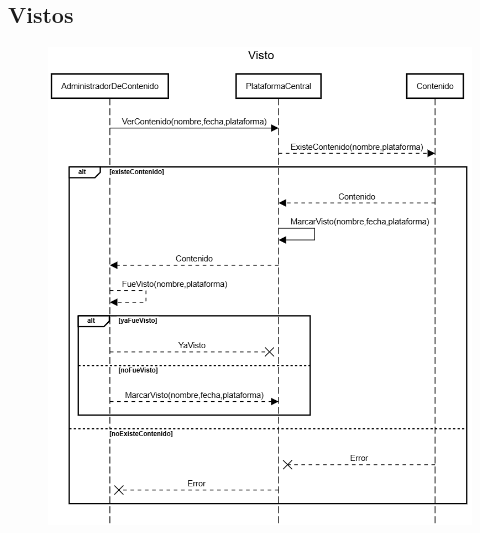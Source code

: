 \clearpage

\subsection{Vistos}\label{subsec:vistos}
\begin{figure}[h]
    \centering
    \includegraphics[width=1\textwidth]{img/visto.png}
\end{figure}

\clearpage


